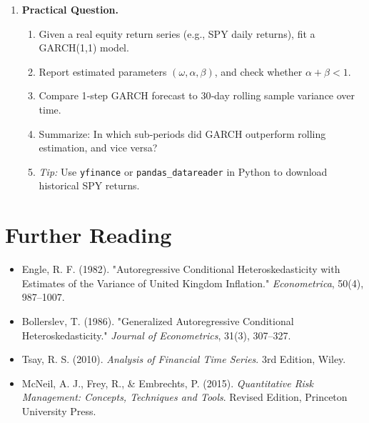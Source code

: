 \documentclass[11pt]{amsart}
\begin{document}
\begin{enumerate}[label=\arabic*.,noitemsep,left=0pt]
	\item \textbf{Practical Question.}\\
	      \begin{enumerate}[noitemsep,left=1em]
		      \item Given a real equity return series (e.g., SPY daily returns), fit a GARCH(1,1) model.
		      \item Report estimated parameters $(\omega,\alpha,\beta)$, and check whether $\alpha + \beta < 1$.
		      \item Compare 1‐step GARCH forecast to 30‐day rolling sample variance over time.
		      \item Summarize: In which sub‐periods did GARCH outperform rolling estimation, and vice versa?
		      \item \emph{Tip:} Use \texttt{yfinance} or \texttt{pandas\_datareader} in Python to download historical SPY returns.
	      \end{enumerate}
\end{enumerate}

\section*{Further Reading}
\begin{itemize}
	\item Engle, R. F. (1982). "Autoregressive Conditional Heteroskedasticity with Estimates of the Variance of United Kingdom Inflation." \emph{Econometrica}, 50(4), 987–1007.
	\item Bollerslev, T. (1986). "Generalized Autoregressive Conditional Heteroskedasticity." \emph{Journal of Econometrics}, 31(3), 307–327.
	\item Tsay, R. S. (2010). \emph{Analysis of Financial Time Series}. 3rd Edition, Wiley.
	\item McNeil, A. J., Frey, R., \& Embrechts, P. (2015). \emph{Quantitative Risk Management: Concepts, Techniques and Tools}. Revised Edition, Princeton University Press.
\end{itemize}

\end{document}
